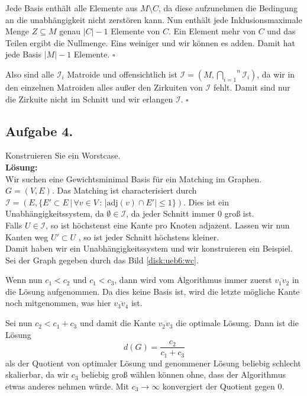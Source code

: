 \documentclass[11pt,a4paper,ngerman]{article}
\begin{document}
Jede Basis enthält alle Elemente
aus $M \setminus C$, da diese aufzunehmen die Bedingung an die unabhängigkeit
nicht zerstören kann. Nun enthält jede Inklusionsmaximale Menge $Z \subseteq M$
genau $|C| - 1$ Elemente von $C$. Ein Element mehr von $C$ und das Teilen
ergibt die Nullmenge. Eins weiniger und wir können es adden. Damit
hat jede Basis $|M| - 1$ Elemente. 
\mbox{}\hfill$\square$

Also sind alle $\mathcal{I}_i$ Matroide und offensichtlich ist
$\mathcal{I} = (M, \overset{n}{\underset{i=1}{\bigcap}} \mathcal{I}_i)$,
da wir in den einzelnen Matroiden alles außer den Zirkuiten von $\mathcal{I}$ 
fehlt. Damit sind nur die Zirkuite nicht im Schnitt und wir erlangen $\mathcal{I}$.
\mbox{}\hfill$\square$

\pagebreak

\subsection*{Aufgabe 4.}
Konstruieren Sie ein Worstcase.\\

\textbf{Lösung:}\\

Wir suchen eine Gewichtsminimal Basis für ein Matching im Graphen.
$G = (V,E)$.
Das Matching ist characterisiert durch
$\mathcal{I} = (E, \{ E' \subset E \, | \, \forall v \in V \, : \, |\text{adj}(v) \cap E'| \leq 1\} )$.
Dies ist ein Unabhängigkeitssystem, da
$\emptyset \in \mathcal{I}$, da jeder Schnitt immer $0$ groß ist.\\
Falls $U \in \mathcal{I}$, so ist höchstenst eine Kante pro Knoten adjazent. Lassen wir nun Kanten weg $U' \subset U$
, so ist jeder Schnitt höchstens kleiner.\\

Damit haben wir ein Unabhängigkeitssystem und wir konstruieren ein Beispiel.\\

Sei der Graph gegeben durch das Bild \ref{disk:ueb6:wc}.



Wenn nun $c_1 < c_2$ und $c_1 < c_3$, dann wird vom Algorithmus immer zuerst $\overline{v_1v_2}$
in die Lösung aufgenommen. Da dies keine Basis ist, wird die letzte mögliche Kante noch mitgenommen,
was hier $\overline{v_3v_4}$ ist.

Sei nun $c_2 < c_1 + c_3$ und damit die Kante $\overline{v_2v_3}$ die optimale Lösung.
Dann ist die Lösung
\begin{equation}
    d(G) = \frac{c_2}{c_1 + c_3}
\end{equation}
als der Quotient von optimaler Lösung und genommener Lösung beliebig schlecht skalierbar,
da wir $c_3$ beliebig groß wählen können ohne, dass der Algorithmus etwas anderes nehmen würde.
Mit $c_3 \rightarrow \infty$ konvergiert der Quotient gegen $0$.

\label{LastPage}
\end{document}
